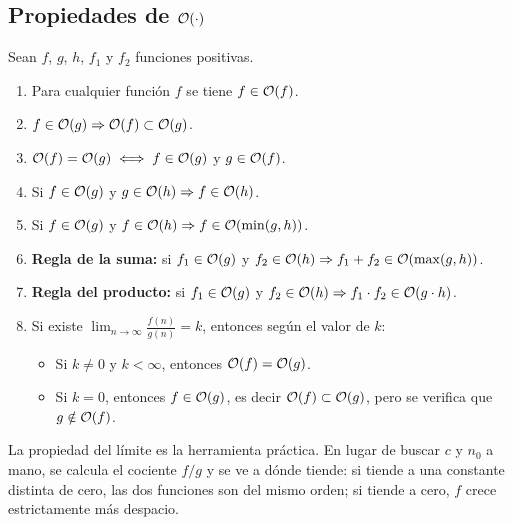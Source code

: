 \documentclass[11pt,letterpaper]{article}
\begin{document}
\subsection*{Propiedades de $\mathcal{O}\!\left(\cdot\right)$}

Sean $f$, $g$, $h$, $f_1$ y $f_2$ funciones positivas.

\begin{enumerate}[itemsep=0.15em]
    \item Para cualquier función $f$ se tiene $f \in \mathcal{O}\!\left(f\right)$.
    \item $f \in \mathcal{O}\!\left(g\right) \Rightarrow \mathcal{O}\!\left(f\right) \subset \mathcal{O}\!\left(g\right)$.
    \item $\mathcal{O}\!\left(f\right) = \mathcal{O}\!\left(g\right) \iff f \in \mathcal{O}\!\left(g\right)$ y $g \in \mathcal{O}\!\left(f\right)$.
    \item Si $f \in \mathcal{O}\!\left(g\right)$ y $g \in \mathcal{O}\!\left(h\right) \Rightarrow
          f \in \mathcal{O}\!\left(h\right)$.
    \item Si $f \in \mathcal{O}\!\left(g\right)$ y $f \in \mathcal{O}\!\left(h\right) \Rightarrow
          f \in \mathcal{O}\!\left(\min(g,h)\right)$.
    \item \textbf{Regla de la suma:} si $f_1 \in \mathcal{O}\!\left(g\right)$ y
          $f_2 \in \mathcal{O}\!\left(h\right) \Rightarrow
          f_1 + f_2 \in \mathcal{O}\!\left(\max(g,h)\right)$.
    \item \textbf{Regla del producto:} si $f_1 \in \mathcal{O}\!\left(g\right)$ y
          $f_2 \in \mathcal{O}\!\left(h\right) \Rightarrow
          f_1 \cdot f_2 \in \mathcal{O}\!\left(g \cdot h\right)$.
    \item Si existe $\displaystyle\lim_{n \to \infty} \frac{f(n)}{g(n)}
          = k$, entonces según el valor de $k$:
          \begin{itemize}[itemsep=0.05em]
              \item Si $k \neq 0$ y $k < \infty$, entonces
                    $\mathcal{O}\!\left(f\right) = \mathcal{O}\!\left(g\right)$.
              \item Si $k = 0$, entonces $f \in \mathcal{O}\!\left(g\right)$, es decir
                    $\mathcal{O}\!\left(f\right) \subset \mathcal{O}\!\left(g\right)$, pero se verifica que
                    $g \notin \mathcal{O}\!\left(f\right)$.
          \end{itemize}
\end{enumerate}

\begin{idea}
    La propiedad del límite es la herramienta práctica. En lugar de
    buscar $c$ y $n_0$ a mano, se calcula el cociente $f/g$ y se ve a
    dónde tiende: si tiende a una constante distinta de cero, las dos
    funciones son del mismo orden; si tiende a cero, $f$ crece
    estrictamente más despacio.
\end{idea}

\end{document}
